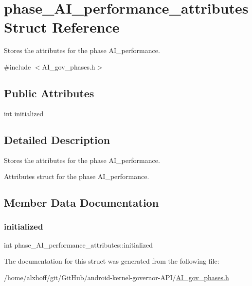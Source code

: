 \hypertarget{structphase__AI__performance__attributes}{}\section{phase\+\_\+\+A\+I\+\_\+performance\+\_\+attributes Struct Reference}
\label{structphase__AI__performance__attributes}


Stores the attributes for the phase A\+I\+\_\+performance.  




{\ttfamily \#include $<$A\+I\+\_\+gov\+\_\+phases.\+h$>$}

\subsection*{Public Attributes}
\begin{DoxyCompactItemize}
\item 
int \hyperlink{structphase__AI__performance__attributes_aba9be00eda0cb18473953ada1e754d64}{initialized}
\end{DoxyCompactItemize}


\subsection{Detailed Description}
Stores the attributes for the phase A\+I\+\_\+performance. 

Attributes struct for the phase A\+I\+\_\+performance. 

\subsection{Member Data Documentation}
\mbox{\label{structphase__AI__performance__attributes_aba9be00eda0cb18473953ada1e754d64}} 
\subsubsection{\texorpdfstring{initialized}{initialized}}
{\footnotesize\ttfamily int phase\+\_\+\+A\+I\+\_\+performance\+\_\+attributes\+::initialized}



The documentation for this struct was generated from the following file\+:\begin{DoxyCompactItemize}
\item 
/home/alxhoff/git/\+Git\+Hub/android-\/kernel-\/governor-\/\+A\+P\+I/\hyperlink{AI__gov__phases_8h}{A\+I\+\_\+gov\+\_\+phases.\+h}\end{DoxyCompactItemize}
